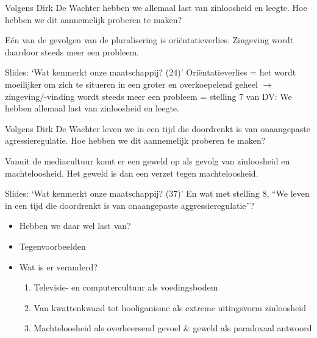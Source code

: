 \documentclass[main.tex]{subfiles}
\begin{document}
\begin{examenvraag}
    \begin{vraag}
        Volgens Dirk De Wachter hebben we allemaal last van zinloosheid en leegte. Hoe hebben we dit aannemelijk proberen te maken?
    \end{vraag}

    \begin{antwoord}
        E\'en van de gevolgen van de pluralisering is ori\"entatieverlies.
        Zingeving wordt daardoor steeds meer een probleem.
        \begin{citaat}{Slides: `Wat kenmerkt onze maatschappij? (24)'}
            Ori\"entatieverlies = het wordt moeilijker om zich te situeren in een groter en overkoepelend geheel $\rightarrow$ zingeving/-vinding wordt steeds meer een probleem = stelling 7 van DV: We hebben allemaal last van zinloosheid en leegte.
        \end{citaat}
    \end{antwoord}
\end{examenvraag}


\begin{examenvraag}
    \begin{vraag}
        Volgens Dirk De Wachter leven we in een tijd die doordrenkt is van onaangepaste agressieregulatie. Hoe hebben we dit aannemelijk proberen te maken?
    \end{vraag}

    \begin{antwoord}
        Vanuit de mediacultuur komt er een geweld op als gevolg van zinloosheid en machteloosheid.
        Het geweld is dan een verzet tegen machteloosheid.
        \begin{citaat}{Slides: `Wat kenmerkt onze maatschappij? (37)'}
            En wat met stelling 8, ``We leven in een tijd die doordrenkt is van onaangepaste aggressieregulatie''?
            \begin{itemize}
                \item Hebben we daar wel last van?
                \item Tegenvoorbeelden
                \item Wat is er veranderd?
                    \begin{enumerate}
                        \item Televisie- en computercultuur als voedingsbodem
                        \item Van kwattenkwaad tot hooliganisme als extreme uitingsvorm zinloosheid
                        \item Machteloosheid als overheersend gevoel \& geweld als paradoxaal antwoord
                    \end{enumerate}
            \end{itemize}
        \end{citaat}
    \end{antwoord}
\end{examenvraag}
\end{document}
